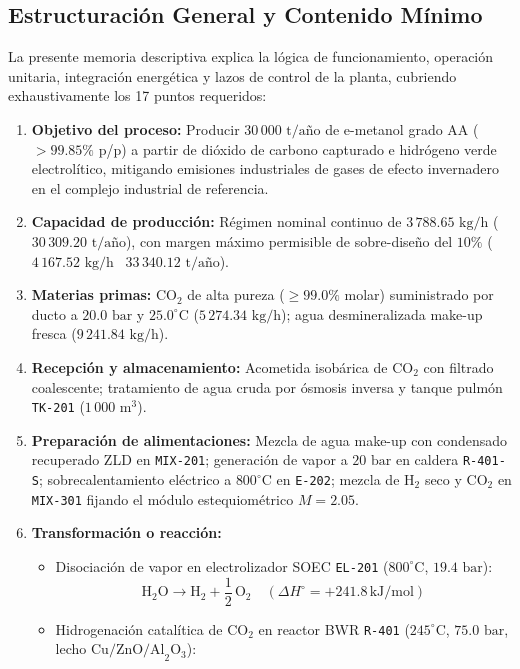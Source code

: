 \documentclass[10pt,letterpaper]{article}
\begin{document}
\subsection{Estructuración General y Contenido Mínimo}
La presente memoria descriptiva explica la lógica de funcionamiento, operación unitaria, integración energética y lazos de control de la planta, cubriendo exhaustivamente los 17 puntos requeridos:
\begin{enumerate}
    \item \textbf{Objetivo del proceso:} Producir $30\,000\text{ t/año}$ de e-metanol grado AA ($>99.85\%$ p/p) a partir de dióxido de carbono capturado e hidrógeno verde electrolítico, mitigando emisiones industriales de gases de efecto invernadero en el complejo industrial de referencia.
    \item \textbf{Capacidad de producción:} Régimen nominal continuo de $3\,788.65\text{ kg/h}$ ($30\,309.20\text{ t/año}$), con margen máximo permisible de sobre-diseño del $10\%$ ($4\,167.52\text{ kg/h}$ \textbar\ $33\,340.12\text{ t/año}$).
    \item \textbf{Materias primas:} $\text{CO}_2$ de alta pureza ($\ge 99.0\%$ molar) suministrado por ducto a $20.0\text{ bar}$ y $25.0^\circ\text{C}$ ($5\,274.34\text{ kg/h}$); agua desmineralizada make-up fresca ($9\,241.84\text{ kg/h}$).
    \item \textbf{Recepción y almacenamiento:} Acometida isobárica de $\text{CO}_2$ con filtrado coalescente; tratamiento de agua cruda por ósmosis inversa y tanque pulmón \texttt{TK-201} ($1\,000\text{ m}^3$).
    \item \textbf{Preparación de alimentaciones:} Mezcla de agua make-up con condensado recuperado ZLD en \texttt{MIX-201}; generación de vapor a $20\text{ bar}$ en caldera \texttt{R-401-S}; sobrecalentamiento eléctrico a $800^\circ\text{C}$ en \texttt{E-202}; mezcla de $\text{H}_2$ seco y $\text{CO}_2$ en \texttt{MIX-301} fijando el módulo estequiométrico $M = 2.05$.
    \item \textbf{Transformación o reacción:}
    \begin{itemize}
        \item Disociación de vapor en electrolizador SOEC \texttt{EL-201} ($800^\circ\text{C}$, $19.4\text{ bar}$):
        \begin{equation}
        \text{H}_2\text{O} \longrightarrow \text{H}_2 + \frac{1}{2}\,\text{O}_2 \quad (\Delta H^\circ = +241.8\,\text{kJ/mol})
        \end{equation}
        \item Hidrogenación catalítica de $\text{CO}_2$ en reactor BWR \texttt{R-401} ($245^\circ\text{C}$, $75.0\text{ bar}$, lecho $\text{Cu/ZnO/Al}_2\text{O}_3$):

\end{itemize}
\end{enumerate}
\end{document}
